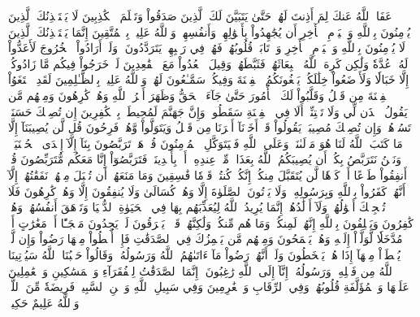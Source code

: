 عَفَا ٱللَّهُ عَنكَ لِمَ أَذِنتَ لَهُمۡ حَتَّىٰ يَتَبَيَّنَ لَكَ ٱلَّذِينَ صَدَقُواْ وَتَعۡلَمَ ٱلۡكَٰذِبِينَ
لَا يَسۡتَـٔۡذِنُكَ ٱلَّذِينَ يُؤۡمِنُونَ بِٱللَّهِ وَٱلۡيَوۡمِ ٱلۡأٓخِرِ أَن يُجَٰهِدُواْ بِأَمۡوَٰلِهِمۡ وَأَنفُسِهِمۡۗ وَٱللَّهُ عَلِيمُۢ بِٱلۡمُتَّقِينَ
إِنَّمَا يَسۡتَـٔۡذِنُكَ ٱلَّذِينَ لَا يُؤۡمِنُونَ بِٱللَّهِ وَٱلۡيَوۡمِ ٱلۡأٓخِرِ وَٱرۡتَابَتۡ قُلُوبُهُمۡ فَهُمۡ فِي رَيۡبِهِمۡ يَتَرَدَّدُونَ
۞وَلَوۡ أَرَادُواْ ٱلۡخُرُوجَ لَأَعَدُّواْ لَهُۥ عُدَّةٗ وَلَٰكِن كَرِهَ ٱللَّهُ ٱنۢبِعَاثَهُمۡ فَثَبَّطَهُمۡ وَقِيلَ ٱقۡعُدُواْ مَعَ ٱلۡقَٰعِدِينَ
لَوۡ خَرَجُواْ فِيكُم مَّا زَادُوكُمۡ إِلَّا خَبَالٗا وَلَأَوۡضَعُواْ خِلَٰلَكُمۡ يَبۡغُونَكُمُ ٱلۡفِتۡنَةَ وَفِيكُمۡ سَمَّـٰعُونَ لَهُمۡۗ وَٱللَّهُ عَلِيمُۢ بِٱلظَّـٰلِمِينَ
لَقَدِ ٱبۡتَغَوُاْ ٱلۡفِتۡنَةَ مِن قَبۡلُ وَقَلَّبُواْ لَكَ ٱلۡأُمُورَ حَتَّىٰ جَآءَ ٱلۡحَقُّ وَظَهَرَ أَمۡرُ ٱللَّهِ وَهُمۡ كَٰرِهُونَ
وَمِنۡهُم مَّن يَقُولُ ٱئۡذَن لِّي وَلَا تَفۡتِنِّيٓۚ أَلَا فِي ٱلۡفِتۡنَةِ سَقَطُواْۗ وَإِنَّ جَهَنَّمَ لَمُحِيطَةُۢ بِٱلۡكَٰفِرِينَ
إِن تُصِبۡكَ حَسَنَةٞ تَسُؤۡهُمۡۖ وَإِن تُصِبۡكَ مُصِيبَةٞ يَقُولُواْ قَدۡ أَخَذۡنَآ أَمۡرَنَا مِن قَبۡلُ وَيَتَوَلَّواْ وَّهُمۡ فَرِحُونَ
قُل لَّن يُصِيبَنَآ إِلَّا مَا كَتَبَ ٱللَّهُ لَنَا هُوَ مَوۡلَىٰنَاۚ وَعَلَى ٱللَّهِ فَلۡيَتَوَكَّلِ ٱلۡمُؤۡمِنُونَ
قُلۡ هَلۡ تَرَبَّصُونَ بِنَآ إِلَّآ إِحۡدَى ٱلۡحُسۡنَيَيۡنِۖ وَنَحۡنُ نَتَرَبَّصُ بِكُمۡ أَن يُصِيبَكُمُ ٱللَّهُ بِعَذَابٖ مِّنۡ عِندِهِۦٓ أَوۡ بِأَيۡدِينَاۖ فَتَرَبَّصُوٓاْ إِنَّا مَعَكُم مُّتَرَبِّصُونَ
قُلۡ أَنفِقُواْ طَوۡعًا أَوۡ كَرۡهٗا لَّن يُتَقَبَّلَ مِنكُمۡ إِنَّكُمۡ كُنتُمۡ قَوۡمٗا فَٰسِقِينَ
وَمَا مَنَعَهُمۡ أَن تُقۡبَلَ مِنۡهُمۡ نَفَقَٰتُهُمۡ إِلَّآ أَنَّهُمۡ كَفَرُواْ بِٱللَّهِ وَبِرَسُولِهِۦ وَلَا يَأۡتُونَ ٱلصَّلَوٰةَ إِلَّا وَهُمۡ كُسَالَىٰ وَلَا يُنفِقُونَ إِلَّا وَهُمۡ كَٰرِهُونَ
فَلَا تُعۡجِبۡكَ أَمۡوَٰلُهُمۡ وَلَآ أَوۡلَٰدُهُمۡۚ إِنَّمَا يُرِيدُ ٱللَّهُ لِيُعَذِّبَهُم بِهَا فِي ٱلۡحَيَوٰةِ ٱلدُّنۡيَا وَتَزۡهَقَ أَنفُسُهُمۡ وَهُمۡ كَٰفِرُونَ
وَيَحۡلِفُونَ بِٱللَّهِ إِنَّهُمۡ لَمِنكُمۡ وَمَا هُم مِّنكُمۡ وَلَٰكِنَّهُمۡ قَوۡمٞ يَفۡرَقُونَ
لَوۡ يَجِدُونَ مَلۡجَـًٔا أَوۡ مَغَٰرَٰتٍ أَوۡ مُدَّخَلٗا لَّوَلَّوۡاْ إِلَيۡهِ وَهُمۡ يَجۡمَحُونَ
وَمِنۡهُم مَّن يَلۡمِزُكَ فِي ٱلصَّدَقَٰتِ فَإِنۡ أُعۡطُواْ مِنۡهَا رَضُواْ وَإِن لَّمۡ يُعۡطَوۡاْ مِنۡهَآ إِذَا هُمۡ يَسۡخَطُونَ
وَلَوۡ أَنَّهُمۡ رَضُواْ مَآ ءَاتَىٰهُمُ ٱللَّهُ وَرَسُولُهُۥ وَقَالُواْ حَسۡبُنَا ٱللَّهُ سَيُؤۡتِينَا ٱللَّهُ مِن فَضۡلِهِۦ وَرَسُولُهُۥٓ إِنَّآ إِلَى ٱللَّهِ رَٰغِبُونَ
۞إِنَّمَا ٱلصَّدَقَٰتُ لِلۡفُقَرَآءِ وَٱلۡمَسَٰكِينِ وَٱلۡعَٰمِلِينَ عَلَيۡهَا وَٱلۡمُؤَلَّفَةِ قُلُوبُهُمۡ وَفِي ٱلرِّقَابِ وَٱلۡغَٰرِمِينَ وَفِي سَبِيلِ ٱللَّهِ وَٱبۡنِ ٱلسَّبِيلِۖ فَرِيضَةٗ مِّنَ ٱللَّهِۗ وَٱللَّهُ عَلِيمٌ حَكِيمٞ
